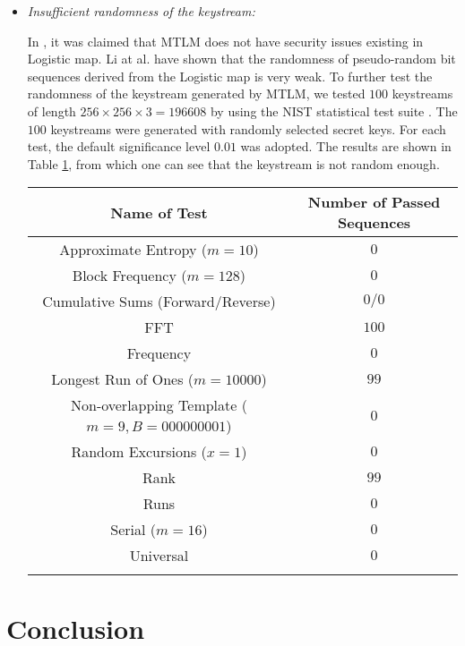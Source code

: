 \documentclass{ws-ijbc}
\begin{document}
\begin{itemize}
\item \textit{Insufficient randomness of the keystream:}

In \cite[Sec.~2.2]{Sam:TLM:MTA2012}, it was claimed
that MTLM does not have security
issues existing in Logistic map. Li at al.
\cite{Li:AttackingBitshiftXOR2007} have shown that the
randomness of pseudo-random bit sequences derived from
the Logistic map is very weak. To further test the
randomness of the keystream generated by MTLM, we tested $100$ keystreams of
length $256\times 256\times 3 = 196608$ by using the NIST
statistical test suite \cite{Rukhin:TestPRNG:NIST10}.
The $100$ keystreams were generated with randomly selected
secret keys. For each test, the default significance level
$0.01$ was adopted. The results are shown in Table \ref{tab:random},
from which one can see that the keystream is not random enough.
\begin{table}[htbp]
{\begin{tabular}{c|c}
\toprule
Name of Test & Number of Passed Sequences \\\hline
Approximate Entropy ($m = 10$) & $0$\\\hline
Block Frequency ($m = 128$) & $0$\\\hline
Cumulative Sums (Forward/Reverse) & $0/0$\\\hline
FFT & $100$\\\hline
Frequency & $0$\\\hline
Longest Run of Ones ($m = 10000$) & $99$\\\hline
Non-overlapping Template ($m = 9, B = 000000001$) & $0$\\\hline
Random Excursions ($x = 1$) & $0$\\\hline
Rank & $99$\\\hline
Runs & $0$\\\hline
Serial ($m = 16$) & $0$\\\hline
Universal & $0$\\
\botrule
\end{tabular}}
\label{tab:random}
\end{table}

\end{itemize}

\section{Conclusion}
\end{document}
